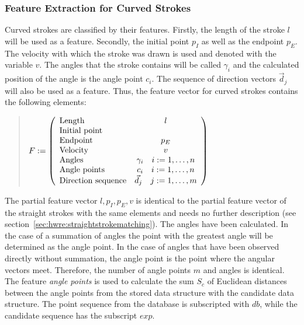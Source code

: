 \subsubsection{Feature Extraction for Curved Strokes}
\label{sec:hwre:featureextractionforcurvedstrokes}
Curved strokes are classified by their features. Firstly, the length of
the stroke \(l\) will be used as a feature. Secondly, the initial point \(p_{I}\)
as well as the endpoint \(p_{E}\). The velocity with which the stroke was drawn
is used and denoted with the variable \(v\). The angles that the stroke contains
will be called \(\gamma_{i}\) and the calculated position of the angle is
the angle point \(c_{i}\). The sequence of direction vectors \(\vec{d}_j\)
will also be used as a feature.
Thus, the feature vector for curved strokes contains the following elements:
\begin{quote}
\(
    F :=
    \left( 
    \begin {array} {l c} 
        \text{Length} & l \\
        \text{Initial point} &  \\
        \text{Endpoint} & p_{E} \\
        \text{Velocity} & v \\
        \text{Angles} & \gamma_{i} \quad i := 1, \ldots , n \\
        \text{Angle points} & c_{i} \quad i := 1, \ldots , n \\
        \text{Direction sequence} & \vec{d}_j \quad j := 1, \ldots , m \\
    \end {array} 
    \right)
\)
\end{quote}
The partial feature vector \( l, p_{I}, p_{E}, v\) is identical to the partial
feature vector of the straight strokes with the same elements and needs no
further description (see section~\ref{sec:hwre:straightstrokematching}).
The angles have been calculated. In the case of a summation
of angles the point with the greatest angle will be determined as the 
angle point. In the case of angles that have been observed directly without 
summation, the angle point is the point where the angular vectors meet.
Therefore, the number of angle points \( m \) and angles is identical.
The feature \emph{angle points} is used to calculate the sum \(S_c\) 
of Euclidean distances between the angle points from the stored data 
structure with the candidate data structure. The point sequence from the 
database is subscripted with \(db\), while the candidate sequence has the
subscript \(exp\).

